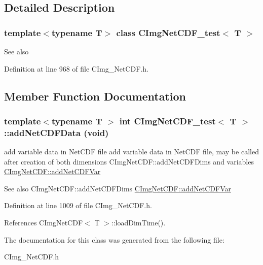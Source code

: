 \subsection{Detailed Description}
\subsubsection*{template$<$typename T$>$ class CImgNetCDF\_\-test$<$ T $>$}


\begin{DoxyCode}
\end{DoxyCode}


\begin{DoxySeeAlso}{See also}

\end{DoxySeeAlso}


Definition at line 968 of file CImg\_\-NetCDF.h.

\subsection{Member Function Documentation}
\hypertarget{classCImgNetCDF__test_aae308b73b10ea3a900000888c571754c}{
\subsubsection[{addNetCDFData}]{\setlength{\rightskip}{0pt plus 5cm}template$<$typename T $>$ int {\bf CImgNetCDF\_\-test}$<$ T $>$::addNetCDFData (void)}}
\label{classCImgNetCDF__test_aae308b73b10ea3a900000888c571754c}


add variable data in NetCDF file add variable data in NetCDF file, may be called after creation of both dimensions {\ttfamily CImgNetCDF::addNetCDFDims} and variables {\ttfamily \hyperlink{classCImgNetCDF_abae347b1449a8e6f65188ace2df5fee6}{CImgNetCDF::addNetCDFVar}} 


\begin{DoxyCode}
\end{DoxyCode}


\begin{DoxySeeAlso}{See also}
CImgNetCDF::addNetCDFDims \hyperlink{classCImgNetCDF_abae347b1449a8e6f65188ace2df5fee6}{CImgNetCDF::addNetCDFVar} 
\end{DoxySeeAlso}


Definition at line 1009 of file CImg\_\-NetCDF.h.

References CImgNetCDF$<$ T $>$::loadDimTime().

The documentation for this class was generated from the following file:\begin{DoxyCompactItemize}
\item 
CImg\_\-NetCDF.h\end{DoxyCompactItemize}
